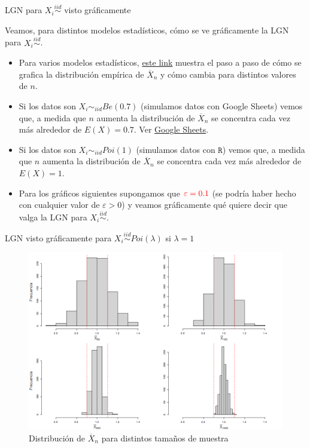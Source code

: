 \documentclass{beamer}
\theoremstyle{definition}
\newcommand{\eps}{\varepsilon}
\begin{document}
\begin{frame}{\color{rosee} LGN para $X_i\stackrel{iid}{\sim}$ visto gráficamente}\small

Veamos, para distintos modelos estadísticos, cómo se ve gráficamente la LGN para $X_i\stackrel{iid}{\sim}$.

\begin{itemize}
\item Para varios modelos estadísticos,  \href{https://onlinestatbook.com/stat_sim/sampling_dist/index.html}{{este link}} muestra el paso a paso de cómo se grafica la distribución empírica de $\overline{X}_n$ y cómo cambia para distintos valores de $n$.
\item Si los datos son $X_i\sim_{iid} Be(0.7)$ (simulamos datos con Google Sheets) vemos que, a medida que $n$ aumenta la distribución de $\overline{X}_n$ se concentra cada vez más alrededor de $E(X)=0.7$. Ver \href{https://docs.google.com/spreadsheets/d/1bmzta6VHw6HJoXqsS89TquYa_glRV8gklpYobSIoT-s/edit?usp=sharing}{Google Sheets}.
    \item Si los datos son $X_i\sim_{iid} Poi(1)$ (simulamos datos con $\texttt{R}$) vemos que, a medida que $n$ aumenta la distribución de $\overline{X}_n$ se concentra cada vez más alrededor de $E(X)=1$.%
    \item Para los gráficos siguientes supongamos que $\color{red}\eps=0.1$ (se podría haber hecho con cualquier valor de $\eps>0$) y veamos gráficamente qué quiere decir que valga la LGN para $X_i\stackrel{iid}{\sim}$.
\end{itemize}
\end{frame}

\begin{frame}{\color{rosee} LGN visto gráficamente para $X_i\stackrel{iid}{\sim}Poi(\lambda)$ si $\lambda=1$}\small
\begin{figure}
    \centering
    \includegraphics[scale=0.3]{slides1/img/Fig1.png}
    \vspace{-0.1cm}
\caption{Distribución de $\overline{X}_n$ para distintos tamaños de muestra}
\end{figure}
\end{frame}
\end{document}
